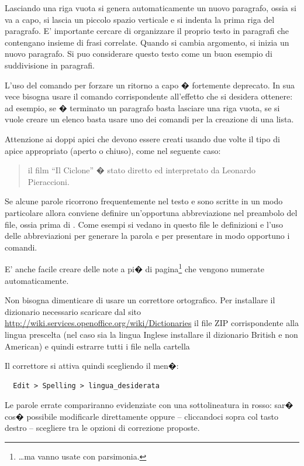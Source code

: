 Lasciando una riga vuota si genera automaticamente un nuovo paragrafo, ossia si va a capo, si lascia un piccolo spazio verticale e si indenta la prima riga del paragrafo.
E' importante cercare di organizzare il proprio testo in paragrafi che contengano insieme di frasi correlate. Quando si cambia argomento, si inizia un nuovo paragrafo. Si puo considerare questo testo come un buon esempio di suddivisione in paragrafi.

L'uso del comando \cmd{\bs\bs} per forzare un ritorno a capo � fortemente deprecato. In sua vece bisogna usare il comando corrispondente all'effetto che si desidera ottenere: ad esempio, se � terminato un paragrafo basta lasciare una riga vuota, se si vuole creare un elenco basta usare uno dei comandi per la creazione di una lista.

Attenzione ai doppi apici  che devono essere creati usando due volte il tipo di apice appropriato (aperto o chiuso), come nel seguente caso:
\begin{quote}
il film ``Il Ciclone'' � stato diretto ed interpretato da Leonardo Pieraccioni.
\end{quote}
Se alcune parole ricorrono frequentemente nel testo e sono scritte in un modo particolare allora conviene definire un'opportuna abbreviazione nel preambolo del file, ossia prima di . Come esempi si vedano in questo file le definizioni e l'uso delle abbreviazioni  per generare la parola \ltx e  per presentare in modo opportuno i comandi.

E' anche facile creare delle note a pi� di pagina\footnote{\ldots ma vanno usate con parsimonia.} che vengono numerate automaticamente.

Non bisogna dimenticare di usare un correttore ortografico. Per installare il dizionario necessario scaricare dal sito \url{http://wiki.services.openoffice.org/wiki/Dictionaries} il file ZIP corrispondente alla lingua prescelta (nel caso sia la lingua Inglese installare il dizionario British e non American) e quindi estrarre tutti i file nella  cartella
\begin{center}
\end{center}
Il correttore si attiva quindi scegliendo il men�:
\begin{verbatim}
  Edit > Spelling > lingua_desiderata
\end{verbatim}
Le parole errate compariranno evidenziate con una sottolineatura in rosso: sar� cos� possibile modificarle direttamente oppure -- cliccandoci sopra col tasto destro -- scegliere tra le opzioni di correzione proposte.

